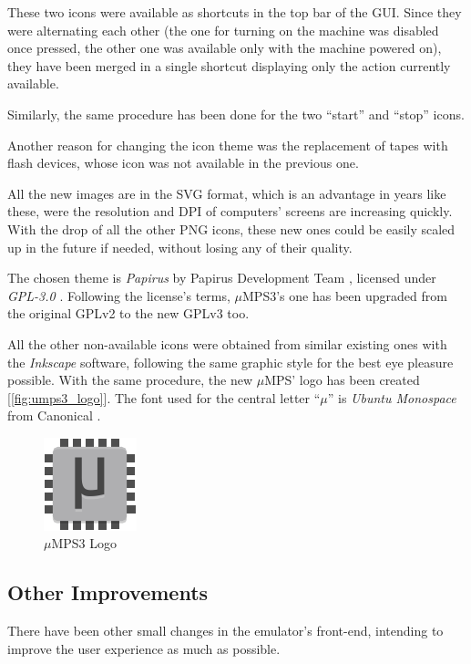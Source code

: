 \documentclass[12pt,a4paper,openright,twoside]{report}
\begin{document}
These two icons were available as shortcuts in the top bar of the GUI.
Since they were alternating each other (the one for turning on the machine was disabled once pressed, the other one was available only with the machine powered on), they have been merged in a single shortcut displaying only the action currently available.

Similarly, the same procedure has been done for the two ``start'' and ``stop'' icons.

Another reason for changing the icon theme was the replacement of tapes with flash devices, whose icon was not available in the previous one.

All the new images are in the SVG format, which is an advantage in years like these, were the resolution and DPI of computers' screens are increasing quickly.
With the drop of all the other PNG icons, these new ones could be easily scaled up in the future if needed, without losing any of their quality.

The chosen theme is \textit{Papirus} by Papirus Development Team \cite{papirus}, licensed under \textit{GPL-3.0} \cite{gpl3}.
Following the license's terms, $\mu$MPS3's one has been upgraded from the original GPLv2 to the new GPLv3 too.

All the other non-available icons were obtained from similar existing ones with the \textit{Inkscape} \cite{inkscape} software, following the same graphic style for the best eye pleasure possible.
With the same procedure, the new $\mu$MPS' logo has been created [\autoref{fig:umps3_logo}].
The font used for the central letter ``$\mu$'' is \textit{Ubuntu Monospace} from Canonical \cite{ubuntu_mono}.
\begin{figure}[h]
	\centering
	\includegraphics[scale=2]{umps3}
	\caption{$\mu$MPS3 Logo}
	\label{fig:umps3_logo}
\end{figure}

\subsection{Other Improvements}
There have been other small changes in the emulator's front-end, intending to improve the user experience as much as possible.
\end{document}

